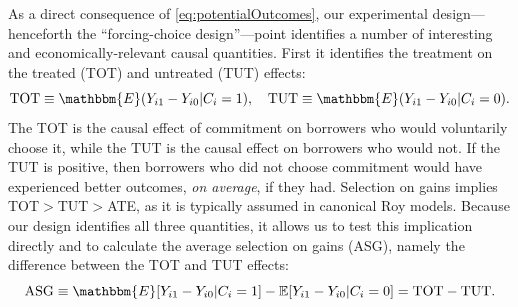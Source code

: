 \documentclass[12pt, a4paper]{article}
\begin{document}
As a direct consequence of \eqref{eq:potentialOutcomes}, our experimental design---henceforth the ``forcing-choice design''---point identifies a number of interesting and economically-relevant causal quantities. 
First it identifies the treatment on the treated (TOT) and untreated (TUT) effects:  
\[
\text{TOT} \equiv \mathbbm{E}(Y_{i1} - Y_{i0} | C_i = 1), \quad
\text{TUT} \equiv \mathbbm{E}(Y_{i1} - Y_{i0} | C_i = 0).
\]
The TOT is the causal effect of commitment on borrowers who would voluntarily choose it, while the TUT is the causal effect on borrowers who would not.
If the TUT is positive, then borrowers who did not choose commitment would have experienced better outcomes, \emph{on average}, if they had. Selection on gains implies TOT$>$TUT$>$ATE, as it is typically assumed in canonical Roy models. Because our design identifies all three quantities, it allows us to test this implication directly and to calculate the average selection on gains (ASG), namely the difference between the TOT and TUT effects:
\[
\text{ASG} \equiv \mathbbm{E}[Y_{i1} - Y_{i0}|C_i = 1] - \mathbb{E}[Y_{i1} - Y_{i0} | C_i = 0] = \text{TOT} - \text{TUT}.
\]
\end{document}
